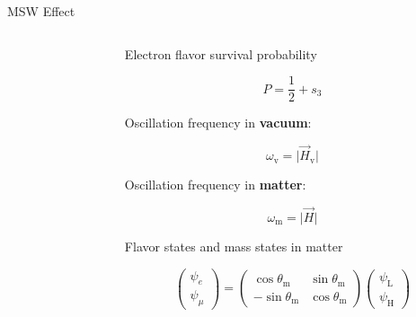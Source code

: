 \documentclass[9pt]{beamer}
\begin{document}
\begin{darkframes}
\begin{frame}{MSW Effect}
{\begin{columns}[T]
\begin{column}{0.5\textwidth}
\end{column}%
\begin{column}{0.5\textwidth}



Electron flavor survival probability

\begin{equation*}
P = \frac{1}{2} + s_3
\end{equation*}

Oscillation frequency in {\bf vacuum}:

\begin{equation*}
    \omega_{\mathrm v} = \lvert \vec H_{\mathrm v} \rvert
\end{equation*}


Oscillation frequency in {\bf matter}:

\begin{equation*}
    \omega_{\mathrm m} = \lvert \vec H \rvert
\end{equation*}

Flavor states and mass states in matter

\begin{equation*}
\begin{pmatrix}
\psi_e\\
\psi_\mu
\end{pmatrix} = \begin{pmatrix}
\cos \theta_{\mathrm m} & \sin\theta_{\mathrm m} \\
-\sin \theta_{\mathrm m} & \cos \theta_{\mathrm m}
\end{pmatrix}\begin{pmatrix}
\psi_{\mathrm L}\\
\psi_{\mathrm H}
\end{pmatrix}
\end{equation*}


\end{column}
\end{columns}


}

\end{frame}
\end{darkframes}
\end{document}

